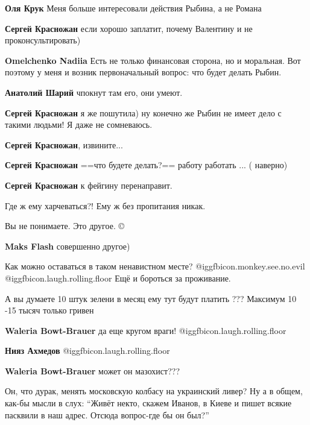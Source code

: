\begin{itemize}
\begin{itemize}
\textbf{Оля Крук} Меня больше интересовали действия Рыбина, а не Романа

\textbf{Сергей Красножан} если хорошо заплатит, почему Валентину и не проконсультировать)

\textbf{Omelchenko Nadiia} Есть не только финансовая сторона, но и моральная. Вот поэтому у меня и возник первоначальный вопрос: что будет делать Рыбин.

\textbf{Анатолий Шарий} чпокнут там его, они умеют.

\textbf{Сергей Красножан} я же пошутила) ну конечно же Рыбин не имеет дело с такими людьми! Я даже не сомневаюсь.

\textbf{Сергей Красножан}, извините...

\textbf{Сергей Красножан} ==что будете делать?==
работу работать ... ( наверно)

\textbf{Сергей Красножан} к фейгину перенаправит.

\end{itemize} %

Где ж ему харчеваться?! Ему ж без пропитания никак.

Вы не понимаете. Это другое. ©️

\textbf{Maks Flash} совершенно другое)


Как можно оставаться в таком ненавистном месте?
@igg{fbicon.monkey.see.no.evil}  @igg{fbicon.laugh.rolling.floor}  Ещё и
бороться за проживание.

\begin{itemize} %
А вы думаете 10 штук зелени в месяц ему тут будут платить ??? Максимум 10 -15 тысяч только гривен

\textbf{Waleria Bowt-Brauer} да еще кругом враги! @igg{fbicon.laugh.rolling.floor} 

\textbf{Нияз Ахмедов} @igg{fbicon.laugh.rolling.floor} 

\textbf{Waleria Bowt-Brauer} может он мазохист???
\end{itemize} %


Он, что дурак, менять московскую колбасу на украинский ливер? Ну а в общем,
как-бы мысли в слух: \enquote{Живёт некто, скажем Иванов, в Киеве и пишет всякие
пасквили в наш адрес. Отсюда вопрос-где бы он был?}



\end{itemize}
